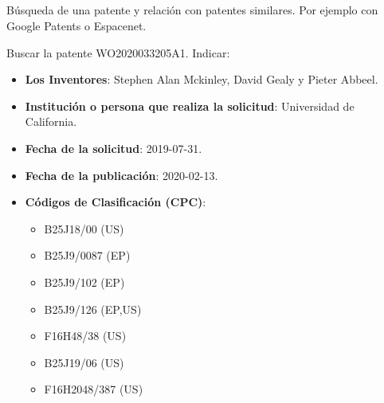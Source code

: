 \subsection{}

Búsqueda de una patente y relación con patentes similares. Por ejemplo con Google Patents o Espacenet.

\vspace{\baselineskip}

Buscar la patente WO2020033205A1. Indicar: 
\begin{itemize}
    \item \textbf{Los Inventores}: Stephen Alan Mckinley, David Gealy y Pieter Abbeel.
    \item \textbf{Institución o persona que realiza la solicitud}: Universidad de California.
    \item \textbf{Fecha de la solicitud}: 2019-07-31.
    \item \textbf{Fecha de la publicación}: 2020-02-13.
    \item \textbf{Códigos de Clasificación (CPC)}:
    \begin{itemize}
        \item B25J18/00 (US) 
        \item B25J9/0087 (EP)
        \item B25J9/102 (EP)
        \item B25J9/126 (EP,US)
        \item F16H48/38 (US) 
        \item B25J19/06 (US)
        \item F16H2048/387 (US)
    \end{itemize}
\end{itemize}



